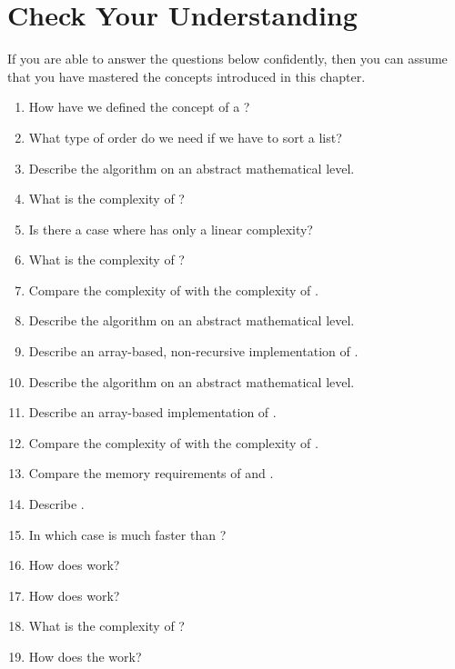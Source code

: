 \section{Check Your Understanding}
If you are able to answer the questions below confidently, then you can assume that you have mastered the concepts
introduced in this chapter.
\begin{enumerate}
\item How have we defined the concept of a ?
\item What type of order do we need if we have to sort a list?
\item Describe the algorithm  on an abstract mathematical level.
\item What is the complexity of ?
\item Is there a case where   has only a linear complexity?
\item What is the complexity of ?
\item Compare the complexity of  with the complexity of .
\item Describe the algorithm  on an abstract mathematical level.
\item Describe an array-based, non-recursive implementation of .
\item Describe the algorithm  on an abstract mathematical level.
\item Describe an array-based implementation of .
\item Compare the complexity of  with the complexity of .
\item Compare the memory requirements of  and .
\item Describe .
\item In which case is  much faster than ?
\item How does  work?
\item How does  work?
\item What is the complexity of ?
\item How does the  work?
\end{enumerate}

